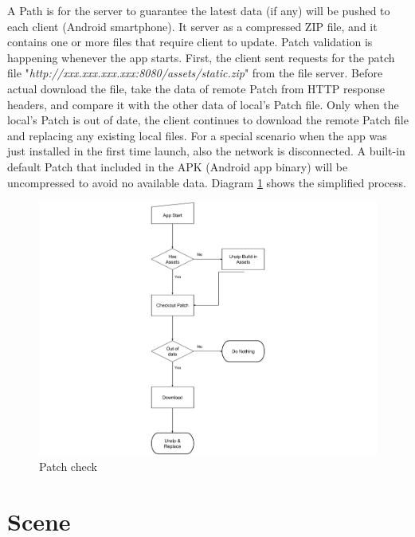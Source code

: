 A Path is for the server to guarantee the latest data (if any) will be pushed to each client (Android smartphone). It server as a compressed ZIP file, and it contains one or more files that require client to update. Patch validation is happening whenever the app starts. First, the client sent requests for the patch file "\emph{http://xxx.xxx.xxx.xxx:8080/assets/static.zip}" from the file server. Before actual download the file, take the  data of remote Patch from HTTP response headers, and compare it with the other  data of local's Patch file. Only when the local's Patch is out of date, the client continues to download the remote Patch file and replacing any existing local files. For a special scenario when the app was just installed in the first time launch, also the network is disconnected. A built-in default Patch that included in the APK (Android app binary) will be uncompressed to avoid no available data. Diagram \ref{fig:patch-check} shows the simplified process.

\begin{figure}[H]
\caption{Patch check}
\label{fig:patch-check}
\centering
\includegraphics[width=\textwidth, keepaspectratio]{Figures/patch-check.png}
\decoRule
\end{figure}

\section{Scene}
\label{section:scene}

